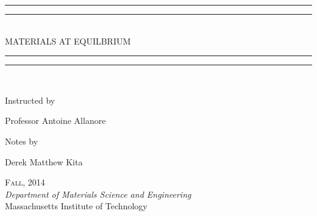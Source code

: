 \documentclass[11pt]{report}
\newlength{\drop}
\begin{document}
  \begin{titlepage}
    \textheight
    \centering
    \vspace*{\baselineskip}
    \rule{\textwidth}{1.6pt}\vspace*{-\baselineskip}\vspace*{2pt}
    \rule{\textwidth}{0.4pt}\\[\baselineskip]
    {\LARGE MATERIALS AT EQUILBRIUM}\\[0.2\baselineskip]
    \rule{\textwidth}{0.4pt}\vspace*{-\baselineskip}\vspace{3.2pt}
    \rule{\textwidth}{1.6pt}\\[\baselineskip]
    \scshape

    \vspace*{2\baselineskip}
    Instructed by \\
    {\Large Professor Antoine Allanore\par} \vspace{2 em}
    \vfill
    Notes by\\
    {\Large Derek Matthew Kita\par} \vspace{2 em}
    {\scshape Fall, 2014} \\
    {\itshape  Department of Materials Science and Engineering \vspace*{0 em}}\\
    {\large Massachusetts Institute of Technology}\par
  \end{titlepage}
\end{document}
